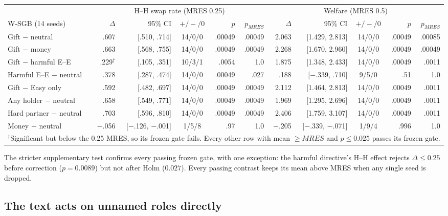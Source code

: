 \documentclass[sigconf,anonymous]{aamas}
\newcommand{\mres}{MRES\xspace}
\begin{document}
\begin{table}[t]
\vspace{6pt}
\begin{tabular}{@{}lrrcrrrrcrr@{}}
\toprule
& \multicolumn{5}{c}{H--H swap rate (\mres{} 0.25)} & \multicolumn{5}{c}{Welfare (\mres{} 0.5)} \\
\cmidrule(lr){2-6}\cmidrule(l){7-11}
W-SGB (14 seeds) & $\Delta$ & 95\% CI & $+/-/0$ & $p$ & $p_{\mres}$ & $\Delta$ & 95\% CI & $+/-/0$ & $p$ & $p_{\mres}$ \\
\midrule
Gift $-$ neutral & .607 & [.510, .714] & 14/0/0 & .00049 & .00049 & 2.063 & [1.429, 2.813] & 14/0/0 & .00049 & .00085 \\
Gift $-$ money & .663 & [.568, .755] & 14/0/0 & .00049 & .00049 & 2.268 & [1.670, 2.960] & 14/0/0 & .00049 & .00049 \\
Gift $-$ harmful E--E & .229$^\dagger$ & [.105, .351] & 10/3/1 & .0054 & 1.0 & 1.875 & [1.348, 2.433] & 14/0/0 & .00049 & .0011 \\
Harmful E--E $-$ neutral & .378 & [.287, .474] & 14/0/0 & .00049 & .027 & .188 & [$-$.339, .710] & 9/5/0 & .51 & 1.0 \\
Gift $-$ Easy only & .592 & [.482, .697] & 14/0/0 & .00049 & .00049 & 2.112 & [1.464, 2.813] & 14/0/0 & .00049 & .0011 \\
Any holder $-$ neutral & .658 & [.549, .771] & 14/0/0 & .00049 & .00049 & 1.969 & [1.295, 2.696] & 14/0/0 & .00049 & .0011 \\
Hard partner $-$ neutral & .703 & [.596, .810] & 14/0/0 & .00049 & .00049 & 2.406 & [1.759, 3.107] & 14/0/0 & .00049 & .0011 \\
Money $-$ neutral & $-$.056 & [$-$.126, $-$.001] & 1/5/8 & .97 & 1.0 & $-$.205 & [$-$.339, $-$.071] & 1/9/4 & .996 & 1.0 \\
\bottomrule
\multicolumn{11}{l}{$^\dagger$Significant but below the 0.25 \mres, so its frozen gate fails.  Every other row with mean $\ge\mres$ and $p\le0.025$ passes its frozen gate.}
\end{tabular}
\end{table}

The stricter supplementary test confirms every passing frozen gate, with one
exception: the harmful directive's H--H effect rejects $\Delta\le0.25$ before
correction ($p=0.0089$) but not after Holm ($0.027$).  Every passing contrast
keeps its mean above \mres{} when any single seed is dropped.

\subsection{The text acts on unnamed roles directly}
\label{sec:fixed}
\end{document}
